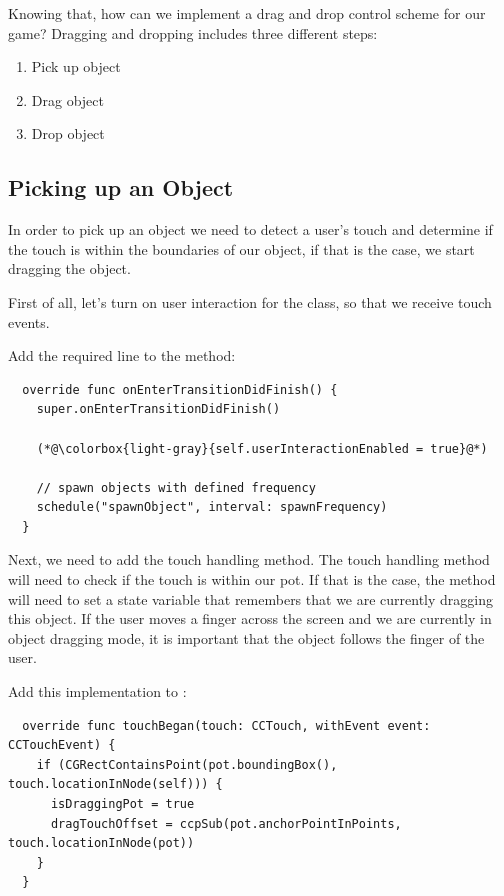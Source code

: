 Knowing that, how can we implement a drag and drop control scheme for our game?
Dragging and dropping includes three different steps:
\begin{enumerate}
  \item Pick up object
  \item Drag object
  \item Drop object
\end{enumerate}

\subsection{Picking up an Object}
In order to pick up an object we need to detect a user's touch and determine if
the touch is within the boundaries of our object, if that is the case,
we start dragging the object.

First of all, let's turn on user interaction for the 
class, so that we receive touch events.

\begin{leftbar}
Add the required line to the  method:
\begin{lstlisting}
  override func onEnterTransitionDidFinish() {
    super.onEnterTransitionDidFinish()
    
    (*@\colorbox{light-gray}{self.userInteractionEnabled = true}@*) 
    
    // spawn objects with defined frequency
    schedule("spawnObject", interval: spawnFrequency)
  }
\end{lstlisting}
\end{leftbar}

Next, we need to add the touch handling method. The touch handling method will
need to check if the touch is within our pot. If that is the case, the method
will need to set a state variable that remembers that we are currently dragging
this object. If the user moves a finger across the screen and we are currently
in object dragging mode, it is important that the object follows the finger of
the user.

\begin{leftbar}
Add this implementation to :
\begin{lstlisting}
  override func touchBegan(touch: CCTouch, withEvent event: CCTouchEvent) {
    if (CGRectContainsPoint(pot.boundingBox(), touch.locationInNode(self))) {
      isDraggingPot = true
      dragTouchOffset = ccpSub(pot.anchorPointInPoints, touch.locationInNode(pot))
    }
  }
\end{lstlisting}
\end{leftbar}

